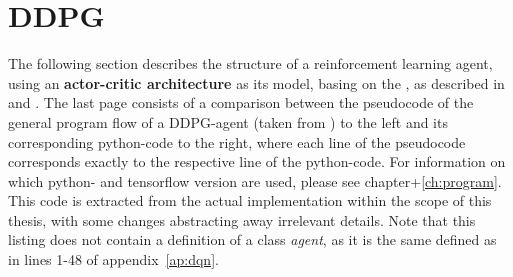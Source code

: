 
\begin{landscape}
	\begin{parcolumns}[distance=0.1em,colwidths={1=33em}]{2}
		\label{ap:dqn_comparison}
		\colchunk[1]{ }
		\colchunk[2]{  }
	\end{parcolumns}
\end{landscape}

\section{DDPG}
\label{ap:ddpg}

The following section describes the structure of a reinforcement learning agent, using an \textbf{actor-critic architecture} as its model, basing on the , as described in \cite{silver_deterministic_2014} and \cite{lillicrap_continuous_2015}. The last page consists of a comparison between the pseudocode of the general program flow of a DDPG-agent (taken from \cite{lillicrap_continuous_2015}) to the left and its corresponding python-code to the right, where each line of the pseudocode corresponds exactly to the respective line of the python-code. For information on which python- and tensorflow version are used, please see chapter+\ref{ch:program}. This code is extracted from the actual implementation within the scope of this thesis, with some changes abstracting away irrelevant details. Note that this listing does not contain a definition of a class \textit{agent}, as it is the same defined as in lines 1-48 of appendix~\ref{ap:dqn}.\\


\begin{landscape}
	\begin{parcolumns}[distance=0.1em,colwidths={1=33em}]{2}
		\label{ap:ddpg_comparison}
		\colchunk[1]{ }
		\colchunk[2]{  }
	\end{parcolumns}
\end{landscape}



